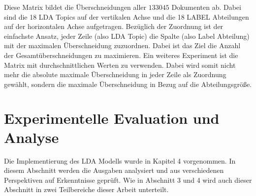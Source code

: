 \documentclass[german,version-2020-11]{uzl-thesis}
\begin{document}

Diese Matrix bildet die Überschneidungen aller $133045$ Dokumenten ab. Dabei sind die 18 LDA Topics auf der vertikalen Achse und die 18 LABEL Abteilungen auf der horizontalen Achse aufgetragen. Bezüglich der Zuordnung ist der einfachste Ansatz, jeder Zeile (also LDA Topic) die Spalte (also Label Abteilung) mit der maximalen Überschneidung zuzuordnen. Dabei ist das Ziel die Anzahl der Gesamtüberschneidungen zu maximieren. Ein weiteres Experiment ist die Matrix mit durchschnittlichen Werten zu verwenden. Dabei wird somit nicht mehr die absolute maximale Überschneidung in jeder Zeile als Zuordnung gewählt, sondern die maximale Überschneidung in Bezug auf die Abteilungsgröße. \\



	
\chapter{Experimentelle Evaluation und Analyse}%
Die Implementierung des LDA Modells wurde in Kapitel 4 vorgenommen. In diesem Abschnitt werden die Ausgaben analysiert und aus verschiedenen Perspektiven auf Erkenntnisse geprüft. Wie in Abschnitt 3 und 4 wird auch dieser Abschnitt in zwei Teilbereiche dieser Arbeit unterteilt.\\
\end{document}
